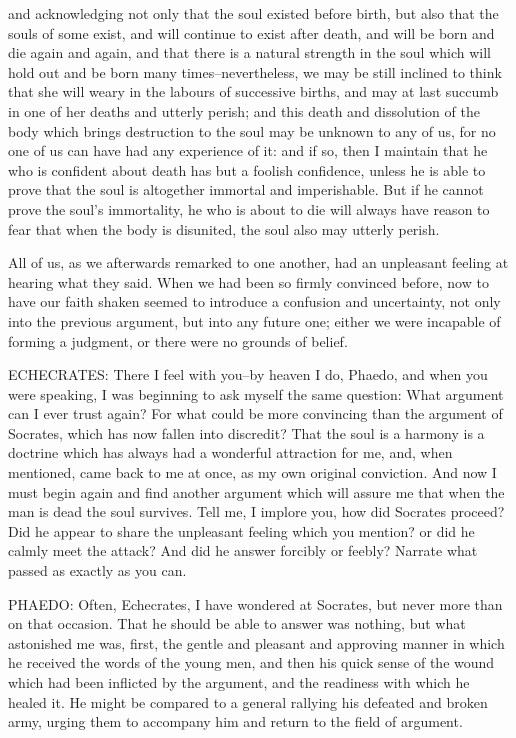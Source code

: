 and acknowledging not only that the soul existed before birth, but also
that the souls of some exist, and will continue to exist after death,
and will be born and die again and again, and that there is a
natural strength in the soul which will hold out and be born many
times--nevertheless, we may be still inclined to think that she will
weary in the labours of successive births, and may at last succumb in
one of her deaths and utterly perish; and this death and dissolution of
the body which brings destruction to the soul may be unknown to any of
us, for no one of us can have had any experience of it: and if so,
then I maintain that he who is confident about death has but a foolish
confidence, unless he is able to prove that the soul is altogether
immortal and imperishable. But if he cannot prove the soul's
immortality, he who is about to die will always have reason to fear that
when the body is disunited, the soul also may utterly perish.

All of us, as we afterwards remarked to one another, had an unpleasant
feeling at hearing what they said. When we had been so firmly convinced
before, now to have our faith shaken seemed to introduce a confusion and
uncertainty, not only into the previous argument, but into any future
one; either we were incapable of forming a judgment, or there were no
grounds of belief.

ECHECRATES: There I feel with you--by heaven I do, Phaedo, and when you
were speaking, I was beginning to ask myself the same question: What
argument can I ever trust again? For what could be more convincing than
the argument of Socrates, which has now fallen into discredit? That
the soul is a harmony is a doctrine which has always had a wonderful
attraction for me, and, when mentioned, came back to me at once, as my
own original conviction. And now I must begin again and find another
argument which will assure me that when the man is dead the soul
survives. Tell me, I implore you, how did Socrates proceed? Did he
appear to share the unpleasant feeling which you mention? or did he
calmly meet the attack? And did he answer forcibly or feebly? Narrate
what passed as exactly as you can.

PHAEDO: Often, Echecrates, I have wondered at Socrates, but never more
than on that occasion. That he should be able to answer was nothing,
but what astonished me was, first, the gentle and pleasant and approving
manner in which he received the words of the young men, and then his
quick sense of the wound which had been inflicted by the argument, and
the readiness with which he healed it. He might be compared to a general
rallying his defeated and broken army, urging them to accompany him and
return to the field of argument.

